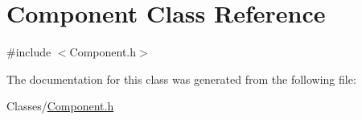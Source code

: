 \hypertarget{classComponent}{\section{Component Class Reference}
\label{classComponent}
}


{\ttfamily \#include $<$Component.\-h$>$}



The documentation for this class was generated from the following file\-:\begin{DoxyCompactItemize}
\item 
Classes/\hyperlink{Component_8h}{Component.\-h}\end{DoxyCompactItemize}

